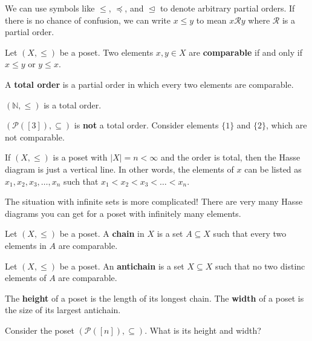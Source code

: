 
\begin{notation}
	We can use symbols like \( \le  \), \( \preceq \), and \( \trianglelefteq \) to denote arbitrary partial orders. If there is no chance of confusion, we can write \( x\le y \) to mean \( x \mathcal{R} y \) where \( \mathcal{R} \) is a partial order.
\end{notation}

\begin{definition}
	Let \( (X, \le ) \) be a poset. Two elements \( x,y \in X \) are \textbf{comparable} if and only if \( x\le y \) or \( y\le x \).
\end{definition}

\begin{definition}
	A \textbf{total order} is a partial order in which every two elements are comparable.
\end{definition}

\begin{eg}
	\( (\mathbb{N},\le ) \) is a total order.
\end{eg}

\begin{eg}
	\( (\mathcal{P}([3]), \subseteq) \) is \textbf{not} a total order. Consider elements \( \{1\} \) and \( \{2\}   \), which are not comparable.
\end{eg}

\begin{note}
	If \( (X, \le ) \) is a poset with \( |X|=n < \infty \) and the order is total, then the Hasse diagram is just a vertical line. In other words, the elements of \( x \) can be listed as \( x_{1},x_{2},x_{3},\ldots ,x_n \) such that \( x_{1}<x_{2}<x_{3}<\ldots <x_n \).
\end{note}

The situation with infinite sets is more complicated! There are very many Hasse diagrams you can get for a poset with infinitely many elements.

\begin{definition}
	Let \( (X, \le ) \) be a poset. A \textbf{chain} in \( X \) is a set \( A \subseteq X \) such that every two elements in \( A \) are comparable.
\end{definition}

\begin{definition}
	Let \( (X, \le ) \) be a poset. An \textbf{antichain} is a set \( X \subseteq X \) such that no two distinc elements of \( A \) are comparable.
\end{definition}

\begin{definition}
	The \textbf{height} of a poset is the length of its longest chain. The \textbf{width} of a poset is the size of its largest antichain.
\end{definition}

Consider the poset \( (\mathcal{P}([n]), \subseteq) \). What is its height and width?
